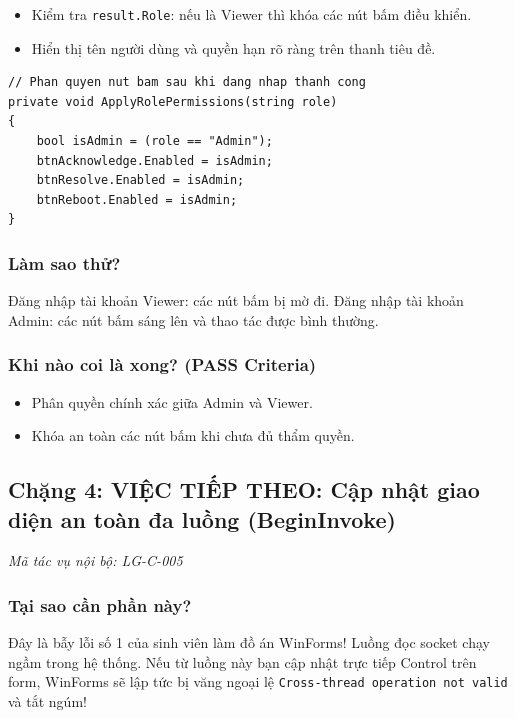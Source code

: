 \documentclass[12pt,a4paper]{article}
\begin{document}
\begin{orientationbox}
\begin{itemize}[leftmargin=1.5em, itemsep=1pt]
  \item Kiểm tra \texttt{result.Role}: nếu là Viewer thì khóa các nút bấm điều khiển.
  \item Hiển thị tên người dùng và quyền hạn rõ ràng trên thanh tiêu đề.
\end{itemize}
\end{orientationbox}

\begin{lstlisting}[language=CSharp, caption={Ví dụ rút gọn: Phân quyền vai trò sau đăng nhập}]
// Phan quyen nut bam sau khi dang nhap thanh cong
private void ApplyRolePermissions(string role)
{
    bool isAdmin = (role == "Admin");
    btnAcknowledge.Enabled = isAdmin;
    btnResolve.Enabled = isAdmin;
    btnReboot.Enabled = isAdmin;
}
\end{lstlisting}

\subsubsection{Làm sao thử?}
Đăng nhập tài khoản Viewer: các nút bấm bị mờ đi. Đăng nhập tài khoản Admin: các nút bấm sáng lên và thao tác được bình thường.

\subsubsection{Khi nào coi là xong? (PASS Criteria)}
\begin{itemize}
  \item Phân quyền chính xác giữa Admin và Viewer.
  \item Khóa an toàn các nút bấm khi chưa đủ thẩm quyền.
\end{itemize}

\subsection{Chặng 4: VIỆC TIẾP THEO: Cập nhật giao diện an toàn đa luồng (BeginInvoke)}
{\footnotesize\color{lgGray}\textit{Mã tác vụ nội bộ: LG-C-005}}\par
\vspace{2mm}

\subsubsection{Tại sao cần phần này?}
Đây là bẫy lỗi số 1 của sinh viên làm đồ án WinForms! Luồng đọc socket chạy ngầm trong hệ thống. Nếu từ luồng này bạn cập nhật trực tiếp Control trên form, WinForms sẽ lập tức bị văng ngoại lệ \texttt{Cross-thread operation not valid} và tắt ngúm!
\end{document}
